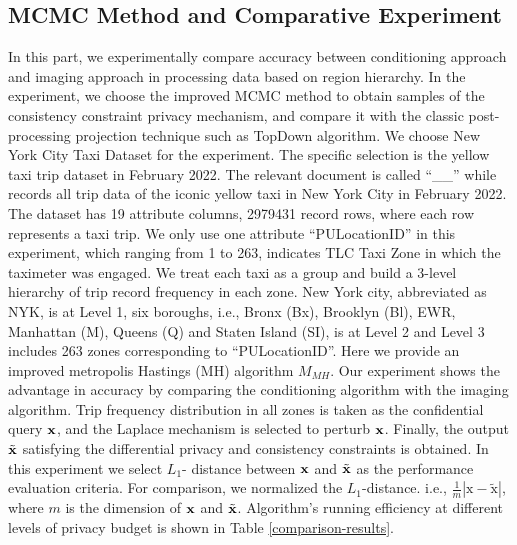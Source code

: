 \documentclass[11pt]{article}
\begin{document}


\subsection{MCMC Method and Comparative Experiment}


In this part, we experimentally compare accuracy  between conditioning approach and imaging approach in processing data based on region hierarchy.  In the experiment, we choose the improved MCMC method to obtain samples of the consistency constraint privacy mechanism, and compare it with the classic post-processing projection technique such as TopDown algorithm. We choose New York City Taxi Dataset for the experiment. The specific selection is the yellow taxi trip dataset in February 2022. The relevant document is called “\!\!\_\!\!\!\!\_\!\!” while records all trip data of the iconic yellow taxi in New York City in February 2022. The dataset has 19 attribute columns, 2979431 record rows, where each row represents a taxi trip. We only use one attribute “PULocationID” in this experiment, which ranging from 1 to 263, indicates TLC Taxi Zone in which the taximeter was engaged. We treat each taxi as a group and build a 3-level hierarchy of trip record frequency in each zone. New York city, abbreviated as NYK, is at Level 1, six boroughs, i.e., Bronx (Bx), Brooklyn (Bl), EWR, Manhattan (M), Queens (Q) and Staten Island (SI), is at Level 2 and Level 3 includes 263 zones corresponding to “PULocationID”.
Here we provide an improved metropolis Hastings (MH) algorithm  $M_{MH}$. Our experiment shows the advantage in accuracy by comparing the conditioning  algorithm with the imaging  algorithm.  Trip frequency distribution in all zones is taken as the confidential query $\bold{x}$, and the Laplace mechanism is selected to perturb $\bold{x}$. Finally, the output  $\tilde{\bold{x}}$ satisfying the differential privacy and consistency constraints is obtained. In this experiment we select $L_1$- distance between $\bold{x}$ and $\tilde{\bold{x}}$ as the performance evaluation criteria. For comparison, we normalized the $L_1$-distance. i.e., $\frac{1}{m}|\text{x}-\tilde{\text{x}}|$, where ${m}$ is the dimension of $\bold{x}$ and $\tilde{\bold{x}}$. Algorithm’s running efficiency at different levels of privacy budget is shown in  Table \ref{comparison-results}.
\end{document}
